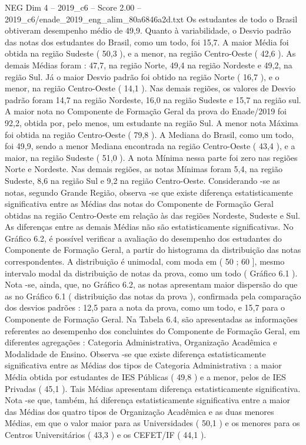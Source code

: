 \begin{textsample}{NEG Dim 4 – 2019\_c6 – Score 2.00 – 2019\_c6/enade\_2019\_eng\_alim\_80a6846a2d.txt}
Os estudantes de todo o Brasil obtiveram desempenho médio de 49,9.
Quanto à variabilidade, o Desvio padrão das notas dos estudantes do Brasil, como um todo, foi 15,7.
A maior Média foi obtida na região Sudeste ( 50,3 ), e a menor, na região Centro-Oeste ( 42,6 ).
As demais Médias foram : 47,7, na região Norte, 49,4 na região Nordeste e 49,2, na região Sul.
Já o maior Desvio padrão foi obtido na região Norte ( 16,7 ), e o menor, na região Centro-Oeste ( 14,1 ).
Nas demais regiões, os valores de Desvio padrão foram 14,7 na região Nordeste, 16,0 na região Sudeste e 15,7 na região sul.
A maior nota no Componente de Formação Geral da prova do Enade/2019 foi 92,2, obtida por, pelo menos, um estudante na região Sul.
A menor nota Máxima foi obtida na região Centro-Oeste ( 79,8 ).
A Mediana do Brasil, como um todo, foi 49,9, sendo a menor Mediana encontrada na região Centro-Oeste ( 43,4 ), e a maior, na região Sudeste ( 51,0 ).
A nota Mínima nessa parte foi zero nas regiões Norte e Nordeste.
Nas demais regiões, as notas Mínimas foram 5,4, na região Sudeste, 8,6 na região Sul e 9,2 na região Centro-Oeste.
Considerando -se as notas, segundo Grande Região, observa -se que existe diferença estatisticamente significativa entre as Médias das notas do Componente de Formação Geral obtidas na região Centro-Oeste em relação às das regiões Nordeste, Sudeste e Sul.
As diferenças entre as demais Médias não são estatisticamente significativas.
No Gráfico 6.2, é possível verificar a avaliação do desempenho dos estudantes do Componente de Formação Geral, a partir do histograma da distribuição das notas correspondentes.
A distribuição é unimodal, com moda em ( 50 ; 60 ], mesmo intervalo modal da distribuição de notas da prova, como um todo ( Gráfico 6.1 ).
Nota -se, ainda, que, no Gráfico 6.2, as notas apresentam maior dispersão do que as no Gráfico 6.1 ( distribuição das notas da prova ), confirmada pela comparação dos desvios padrões : 12,5 para a nota da prova, como um todo, e 15,7 para o Componente de Formação Geral.
Na Tabela 6.4, são apresentadas as informações referentes ao desempenho dos concluintes do Componente de Formação Geral, em diferentes agregações : Categoria Administrativa, Organização Acadêmica e Modalidade de Ensino.
Observa -se que existe diferença estatisticamente significativa entre as Médias dos tipos de Categoria Administrativa : a maior Média obtida por estudantes de IES Públicas ( 49,8 ) e a menor, pelos de IES Privadas ( 45,1 ).
Tais Médias apresentam diferença estatisticamente significativa.
Nota -se que, também, há diferença estatisticamente significativa entre a maior das Médias dos quatro tipos de Organização Acadêmica e as duas menores Médias, em que o valor maior para as Universidades ( 50,1 ) e os menores para os Centros Universitários ( 43,3 ) e os CEFET/IF ( 44,1 ).

\end{textsample}
